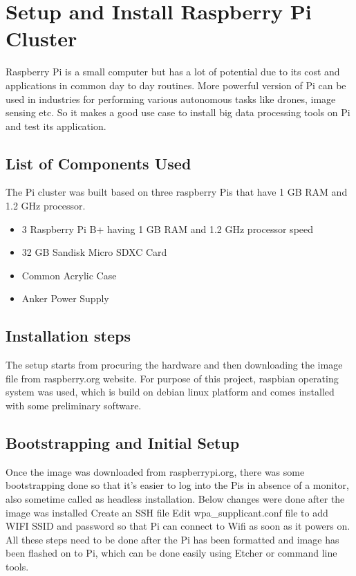 \section{Setup and Install Raspberry Pi Cluster}

Raspberry Pi is a small computer but has a lot of potential due to its
cost and applications in common day to day routines. More powerful
version of Pi can be used in industries for performing various
autonomous tasks like drones, image sensing etc. So it makes a good
use case to install big data processing tools on Pi and test its
application.

\subsection{List of Components Used}

The Pi cluster was built based on three raspberry Pis that have 1 GB
RAM and 1.2 GHz processor.

\begin{itemize}
	\item 3 Raspberry Pi B+ having 1 GB RAM and 1.2 GHz processor speed
	\item 32 GB Sandisk Micro SDXC Card
	\item Common Acrylic Case
	\item Anker Power Supply
\end{itemize}

\subsection{Installation steps}

The setup starts from procuring the hardware and then downloading the
image file from raspberry.org website. For purpose of this project,
raspbian operating system was used, which is build on debian linux
platform and comes installed with some preliminary software.

\subsection{Bootstrapping and Initial Setup}

Once the image was downloaded from raspberrypi.org, there was some
bootstrapping done so that it's easier to log into the Pis in absence
of a monitor, also sometime called as headless installation.  Below
changes were done after the image was installed Create an SSH file
Edit wpa\_supplicant.conf file to add WIFI SSID and password so that
Pi can connect to Wifi as soon as it powers on. All these steps need
to be done after the Pi has been formatted and image has been flashed
on to Pi, which can be done easily using Etcher or command line tools.

